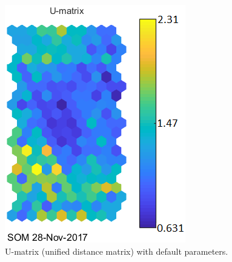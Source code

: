 \documentclass[a4paper,11pt,twocolumn]{article}
\begin{document}
\begin{figure}[htbp]
\begin{minipage}[t]{0.45\linewidth}
  \centering
  \includegraphics[width=\linewidth]{figures/U-matrix.png}
  \caption{U-matrix (unified distance matrix) with default parameters.}
  \label{fig:u}
\end{minipage}%
    \hfill%
\begin{minipage}[t]{0.45\linewidth}
  \centering

\end{minipage}
\end{figure}
\end{document}

